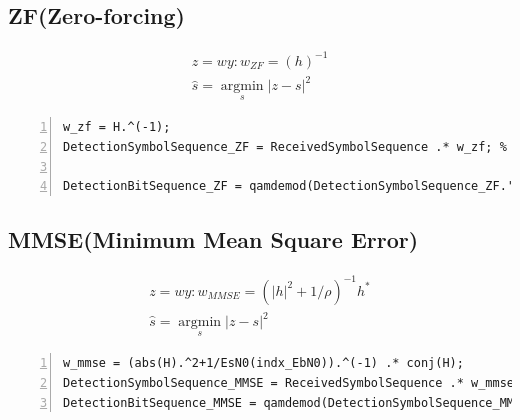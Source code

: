 \documentclass{article}
\providecommand{\abs}[1]{\lvert#1\rvert}
\begin{document}
\subsection{ZF(Zero-forcing)}
\begin{gather}
z=wy : w_{ZF}=(h)^{-1}\\
\hat{s}=\operatorname*{argmin}_s \abs{z-s}^2
\end{gather}
\begin{lstlisting}[style=Matlab-editor, frame=single, numbers=left,]
w_zf = H.^(-1);
DetectionSymbolSequence_ZF = ReceivedSymbolSequence .* w_zf; % Detection (Zero-Forcing: y / h)

DetectionBitSequence_ZF = qamdemod(DetectionSymbolSequence_ZF.', M, 'OutputType', 'bit', 'UnitAveragePower', 1)';
\end{lstlisting}
\subsection{MMSE(Minimum Mean Square Error)}
\begin{gather}
z=wy : w_{MMSE}=(\abs{h}^2+1/\rho)^{-1}h^*\\
\hat{s}=\operatorname*{argmin}_s \abs{z-s}^2
\end{gather}
\begin{lstlisting}[style=Matlab-editor, frame=single, numbers=left,]
w_mmse = (abs(H).^2+1/EsN0(indx_EbN0)).^(-1) .* conj(H);
DetectionSymbolSequence_MMSE = ReceivedSymbolSequence .* w_mmse;
DetectionBitSequence_MMSE = qamdemod(DetectionSymbolSequence_MMSE.', M, 'OutputType', 'bit', 'UnitAveragePower', 1)';
\end{lstlisting}
\end{document}
